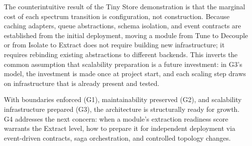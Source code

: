 The counterintuitive result of the Tiny Store demonstration is that the marginal cost of each spectrum transition is configuration, not construction. Because caching adapters, queue abstractions, schema isolation, and event contracts are established from the initial deployment, moving a module from Tune to Decouple or from Isolate to Extract does not require building new infrastructure; it requires rebinding existing abstractions to different backends. This inverts the common assumption that scalability preparation is a future investment: in G3's model, the investment is made once at project start, and each scaling step draws on infrastructure that is already present and tested.

With boundaries enforced (G1), maintainability preserved (G2), and scalability infrastructure prepared (G3), the architecture is structurally ready for growth. G4 addresses the next concern: when a module's extraction readiness score warrants the Extract level, how to prepare it for independent deployment via event-driven contracts, saga orchestration, and controlled topology changes.
